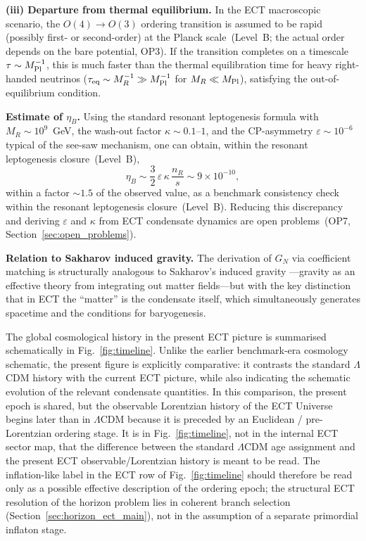 \documentclass[11pt,a4paper]{article}
\numberwithin{equation}{section}
\begin{document}
\textbf{(iii) Departure from thermal equilibrium.}
In the ECT macroscopic scenario, the $O(4)\to O(3)$ ordering
transition is assumed to be rapid (possibly first- or
second-order) at the Planck scale~(Level~B; the actual
order depends on the bare potential, OP3).
If the transition completes on a timescale
$\tau\sim M_{\rm Pl}^{-1}$, this is much faster than the
thermal equilibration time for heavy right-handed neutrinos
($\tau_{\rm eq}\sim M_R^{-1} \gg M_{\rm Pl}^{-1}$ for $M_R\ll M_{\rm Pl}$),
satisfying the out-of-equilibrium condition.

\textbf{Estimate of $\eta_B$.}
Using the standard resonant leptogenesis formula with
$M_R\sim10^9$~GeV, the wash-out factor $\kappa\sim0.1$--$1$,
and the CP-asymmetry $\varepsilon\sim10^{-6}$ typical of the
see-saw mechanism, one can obtain, within the resonant leptogenesis
closure~(Level~B),
\begin{equation}
\eta_B
\sim \frac{3}{2}\,\varepsilon\,\kappa\,\frac{n_R}{s}
\sim 9\times10^{-10},
\end{equation}
within a factor $\sim\!1.5$ of the observed value, as a
benchmark consistency check within the resonant leptogenesis
closure~(Level~B). Reducing this discrepancy and deriving
$\varepsilon$ and $\kappa$ from ECT condensate dynamics
are open problems~(OP7, Section~\ref{sec:open_problems}).

\textbf{Relation to Sakharov induced gravity.}
The derivation of $G_N$ via coefficient matching is structurally
analogous to Sakharov's induced gravity
\cite{Sakharov1968}---gravity as an effective theory from integrating
out matter fields---but with the key distinction that in ECT the
``matter'' is the condensate itself, which simultaneously generates
spacetime and the conditions for baryogenesis.

The global cosmological history in the present ECT picture is
summarised schematically in Fig.~\ref{fig:timeline}.
Unlike the earlier benchmark-era cosmology schematic, the present
figure is explicitly comparative: it contrasts the standard
$\Lambda$CDM history with the current ECT picture, while also
indicating the schematic evolution of the relevant condensate
quantities.
In this comparison, the present epoch is shared, but the observable
Lorentzian history of the ECT Universe begins later than in
$\Lambda$CDM because it is preceded by an Euclidean /
pre-Lorentzian ordering stage.
It is in Fig.~\ref{fig:timeline}, not in the internal ECT sector
map, that the difference between the standard $\Lambda$CDM age
assignment and the present ECT observable/Lorentzian history is
meant to be read.
The inflation-like label in the ECT row of Fig.~\ref{fig:timeline}
should therefore be read only as a possible effective description of the
ordering epoch; the structural ECT resolution of the horizon problem
lies in coherent branch selection
(Section~\ref{sec:horizon_ect_main}), not in the assumption of a
separate primordial inflaton stage.
\end{document}
